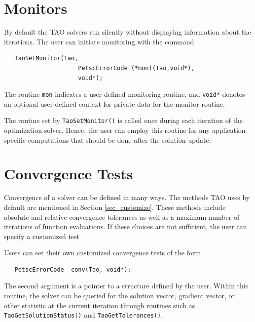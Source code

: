 \documentclass[]{book}
\begin{document}
\section{Monitors}
By default the TAO solvers run silently without displaying information
about the iterations. The user can initiate monitoring with the
command %
\begin{verbatim}
   TaoSetMonitor(Tao,
                     PetscErrorCode (*mon)(Tao,void*),
                     void*);
\end{verbatim}
\noindent
The routine {\tt mon} indicates a user-defined monitoring routine,
and {\tt void*} denotes an optional user-defined context for private 
data for the monitor routine.

The routine set by {\tt TaoSetMonitor()} is called once during each
iteration of the optimization solver.  Hence, the user can employ this 
routine for any application-specific computations that should be done 
after the solution update. 





\section{Convergence Tests}
\label{sec_Taoconvergence}

Convergence of a solver can be defined in many ways.
The methods TAO uses by default are mentioned in 
Section \ref{sec_customize}.
These methods include absolute and relative convergence tolerances as well
as a maximum number of iterations of function evaluations.
If these choices are not sufficient, 
the user can specify a customized test%

Users can set their own customized convergence tests of the form
\begin{verbatim}
   PetscErrorCode  conv(Tao, void*);
\end{verbatim}
\noindent
The second argument is a pointer to a structure defined by the user.
Within this routine, the solver
can be queried for the solution vector, gradient vector,
or other statistic at the current iteration through routines such as
{\tt TaoGetSolutionStatus()} and  {\tt TaoGetTolerances()}.
\end{document}
